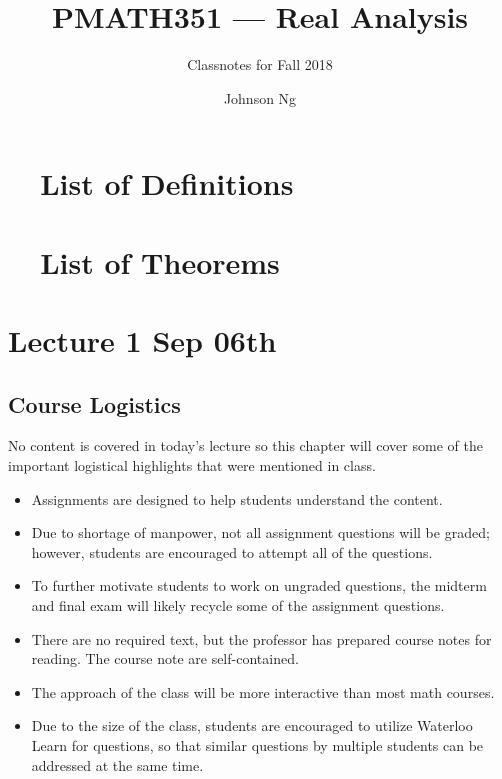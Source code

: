 \documentclass[notoc,notitlepage]{tufte-book}
\title{PMATH351 --- Real Analysis}
\author{Johnson Ng}
\subtitle{Classnotes for Fall 2018}
\begin{document}
\hypersetup{pageanchor=false}
\maketitle
\hypersetup{pageanchor=true}
\begin{fullwidth}
\tableofcontents
\end{fullwidth}

\chapter*{\faBook\ \enspace\ List of Definitions}
\begin{fullwidth}
\end{fullwidth}

\chapter*{\faCoffee\ \enspace\ List of Theorems}
\begin{fullwidth}
\end{fullwidth}

\nocite{bforres2018}

\chapter{Lecture 1 Sep 06th}%
\label{chp:lecture_1_sep_06th}

\section{Course Logistics}%
\label{sec:course_logistics}

No content is covered in today's lecture so this chapter will cover some of the important logistical highlights that were mentioned in class.

\begin{itemize}
  \item Assignments are designed to help students understand the content.
  \item Due to shortage of manpower, not all assignment questions will be graded; however, students are encouraged to attempt all of the questions.
  \item To further motivate students to work on ungraded questions, the midterm and final exam will likely recycle some of the assignment questions.
  \item There are no required text, but the professor has prepared course notes for reading. The course note are self-contained.
  \item The approach of the class will be more interactive than most math courses.
  \item Due to the size of the class, students are encouraged to utilize Waterloo Learn for questions, so that similar questions by multiple students can be addressed at the same time.
\end{itemize}
\end{document}
